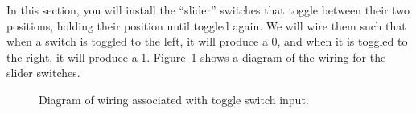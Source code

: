 In this section, you will install the ``slider'' switches that toggle between their two positions, holding their position until toggled again.
We will wire them such that when a switch is toggled to the left, it will produce a 0, and when it is toggled to the right, it will produce a 1.
Figure~\ref{fig:switch-diagram} shows a diagram of the wiring for the slider switches.

\begin{figure}[p]
    \centering
    \caption{Diagram of wiring associated with toggle switch input.
        \label{fig:switch-diagram}}
\end{figure}

\disconnect\

